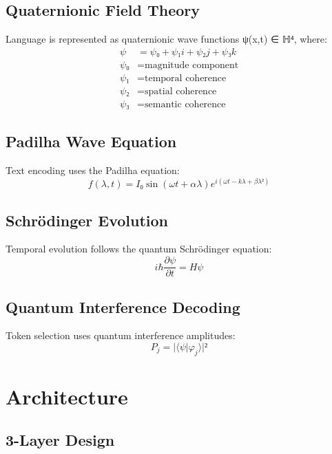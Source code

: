 \documentclass[11pt,a4paper]{article}
\begin{document}
\subsection{Quaternionic Field Theory}

Language is represented as quaternionic wave functions ψ(x,t) ∈ ℍ⁴, where:
\begin{align}
ψ &= ψ₀ + ψ₁i + ψ₂j + ψ₃k \\
ψ₀ &= \text{magnitude component} \\
ψ₁ &= \text{temporal coherence} \\
ψ₂ &= \text{spatial coherence} \\
ψ₃ &= \text{semantic coherence}
\end{align}

\subsection{Padilha Wave Equation}

Text encoding uses the Padilha equation:
\begin{equation}
f(λ,t) = I₀ \sin(ωt + αλ) e^{i(ωt - kλ + βλ²)}
\end{equation}

\subsection{Schrödinger Evolution}

Temporal evolution follows the quantum Schrödinger equation:
\begin{equation}
iℏ \frac{\partial ψ}{\partial t} = H ψ
\end{equation}

\subsection{Quantum Interference Decoding}

Token selection uses quantum interference amplitudes:
\begin{equation}
P_j = |⟨ψ|φ_j⟩|²
\end{equation}

\section{Architecture}

\subsection{3-Layer Design}
\end{document}
